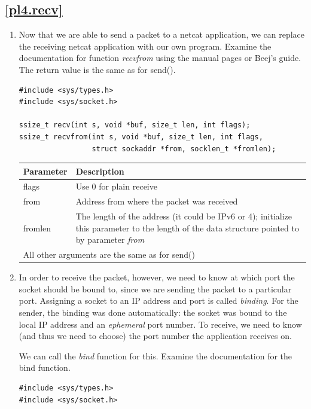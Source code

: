 \documentclass[12pt]{book}
\begin{document}
\subsection{\ref{pl4.recv}}

\begin{enumerate}[resume*]
\item Now that we are able to send a packet to a netcat application, we can replace the receiving netcat application with our own program. Examine the documentation for function \emph{recvfrom} using the manual pages or Beej's guide. The return value is the same as for send().

  \begin{lstlisting}
#include <sys/types.h>
#include <sys/socket.h>

ssize_t recv(int s, void *buf, size_t len, int flags);
ssize_t recvfrom(int s, void *buf, size_t len, int flags,
                 struct sockaddr *from, socklen_t *fromlen);  
  \end{lstlisting}

  \begin{tabular}{l p{10cm}}
    \toprule
    Parameter & Description \\
    \midrule
    flags & Use 0 for plain receive \\
    from & Address from where the packet was received \\
    fromlen & The length of the address (it could be IPv6 or 4); initialize this parameter to the length of the data structure pointed to by parameter \emph{from}\\
    \multicolumn{2}{l}{All other arguments are the same as for send()} \\
    \bottomrule
  \end{tabular}
  
\item In order to receive the packet, however, we need to know at which port the socket should be bound to, since we are sending the packet to a particular port. Assigning a socket to an IP address and port is called \emph{binding}. For the sender, the binding was done automatically: the socket was bound to the local IP address and an \emph{ephemeral} port number. To receive, we need to know (and thus we need to choose) the port number the application receives on.

  We can call the \emph{bind} function for this. Examine the documentation for the bind function.

  \begin{lstlisting}
#include <sys/types.h>
#include <sys/socket.h>


\end{lstlisting}
\end{enumerate}
\end{document}
